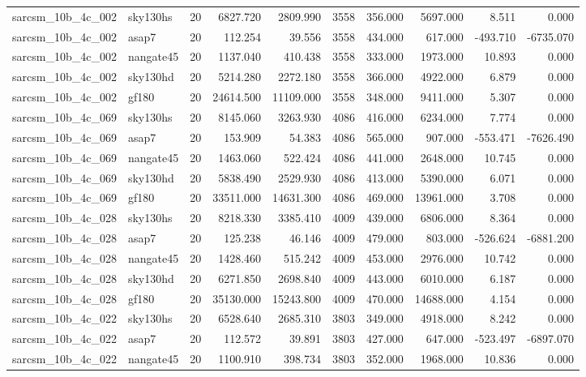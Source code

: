 \begin{longtable}{llrrrrrrrr}
sarcsm\_10b\_4c\_002 & sky130hs & 20 & 6827.720 & 2809.990 & 3558 & 356.000 & 5697.000 & 8.511 & 0.000 \\
sarcsm\_10b\_4c\_002 & asap7 & 20 & 112.254 & 39.556 & 3558 & 434.000 & 617.000 & -493.710 & -6735.070 \\
sarcsm\_10b\_4c\_002 & nangate45 & 20 & 1137.040 & 410.438 & 3558 & 333.000 & 1973.000 & 10.893 & 0.000 \\
sarcsm\_10b\_4c\_002 & sky130hd & 20 & 5214.280 & 2272.180 & 3558 & 366.000 & 4922.000 & 6.879 & 0.000 \\
sarcsm\_10b\_4c\_002 & gf180 & 20 & 24614.500 & 11109.000 & 3558 & 348.000 & 9411.000 & 5.307 & 0.000 \\
sarcsm\_10b\_4c\_069 & sky130hs & 20 & 8145.060 & 3263.930 & 4086 & 416.000 & 6234.000 & 7.774 & 0.000 \\
sarcsm\_10b\_4c\_069 & asap7 & 20 & 153.909 & 54.383 & 4086 & 565.000 & 907.000 & -553.471 & -7626.490 \\
sarcsm\_10b\_4c\_069 & nangate45 & 20 & 1463.060 & 522.424 & 4086 & 441.000 & 2648.000 & 10.745 & 0.000 \\
sarcsm\_10b\_4c\_069 & sky130hd & 20 & 5838.490 & 2529.930 & 4086 & 413.000 & 5390.000 & 6.071 & 0.000 \\
sarcsm\_10b\_4c\_069 & gf180 & 20 & 33511.000 & 14631.300 & 4086 & 469.000 & 13961.000 & 3.708 & 0.000 \\
sarcsm\_10b\_4c\_028 & sky130hs & 20 & 8218.330 & 3385.410 & 4009 & 439.000 & 6806.000 & 8.364 & 0.000 \\
sarcsm\_10b\_4c\_028 & asap7 & 20 & 125.238 & 46.146 & 4009 & 479.000 & 803.000 & -526.624 & -6881.200 \\
sarcsm\_10b\_4c\_028 & nangate45 & 20 & 1428.460 & 515.242 & 4009 & 453.000 & 2976.000 & 10.742 & 0.000 \\
sarcsm\_10b\_4c\_028 & sky130hd & 20 & 6271.850 & 2698.840 & 4009 & 443.000 & 6010.000 & 6.187 & 0.000 \\
sarcsm\_10b\_4c\_028 & gf180 & 20 & 35130.000 & 15243.800 & 4009 & 470.000 & 14688.000 & 4.154 & 0.000 \\
sarcsm\_10b\_4c\_022 & sky130hs & 20 & 6528.640 & 2685.310 & 3803 & 349.000 & 4918.000 & 8.242 & 0.000 \\
sarcsm\_10b\_4c\_022 & asap7 & 20 & 112.572 & 39.891 & 3803 & 427.000 & 647.000 & -523.497 & -6897.070 \\
sarcsm\_10b\_4c\_022 & nangate45 & 20 & 1100.910 & 398.734 & 3803 & 352.000 & 1968.000 & 10.836 & 0.000 \\

\end{longtable}
